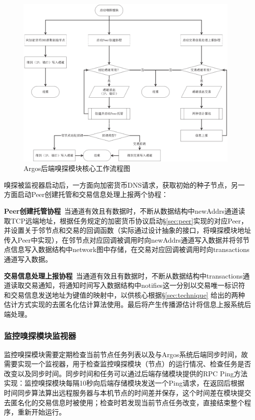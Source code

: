 \documentclass[supercite]{HustGraduPaper}
\newcommand{\xfig}[3]{
  \begin{figure}[htb]
    \centering
    #3
    \caption{#2}
    \label{fig:#1}
  \end{figure}
}
\theoremstyle{definition}
\begin{document}
\xfig{impl:sniffer}{Argos后端嗅探模块核心工作流程图}{
  \includegraphics[width=0.98\textwidth]{images/4.3-sniffer.ps}
}

嗅探被监视器启动后，一方面向加密货币DNS请求，获取初始的种子节点，另一方面启动Peer创建托管和交易信息处理上报两个协程：

\textbf{Peer创建托管协程}\ 当通道有效且有数据时，不断从数据结构中newAddrs通道读取TCP远端地址，根据任务规定的加密货币协议启动\S \ref{sec:peer}实现的对应Peer，并设置关于邻节点和交易的回调函数（实际通过设计抽象的接口，将嗅探模块地址传入Peer中实现），在邻节点对应回调被调用时向newAddrs通道写入数据并将邻节点信息写入数据结构中network图中存储，在交易对应回调被调用时向transactions通道写入数据。

\textbf{交易信息处理上报协程}\ 当通道有效且有数据时，不断从数据结构中transactions通道读取交易通知，将通知时间写入数据结构中notifies这一分别以交易唯一标识符和交易信息发送地址为键值的映射中，以供核心根据\S \ref{sec:technique} 给出的两种估计方式实现的去匿名化估计算法使用。最后将产生传播源估计将信息上报系统后端处理。

\subsubsection{监控嗅探模块监视器}
监控嗅探模块需要定期检查当前节点任务列表以及与Argos系统后端同步时间，故需要实现一个监视器，用于检查监控嗅探模块（节点）的运行情况、检查任务是否改变以及同步时间。同步时间和任务可以通过后端存储模块提供的RPC Ping方法实现：监控嗅探模块每隔10秒向后端存储模块发送一个Ping请求，在返回后根据时间同步算法算出远程服务器与本机节点的时间差并保存，这个时间差在模块提交去匿名化的交易信息时被使用；检查时若发现当前节点任务改变，直接结束整个程序，重新开始运行。
\end{document}
